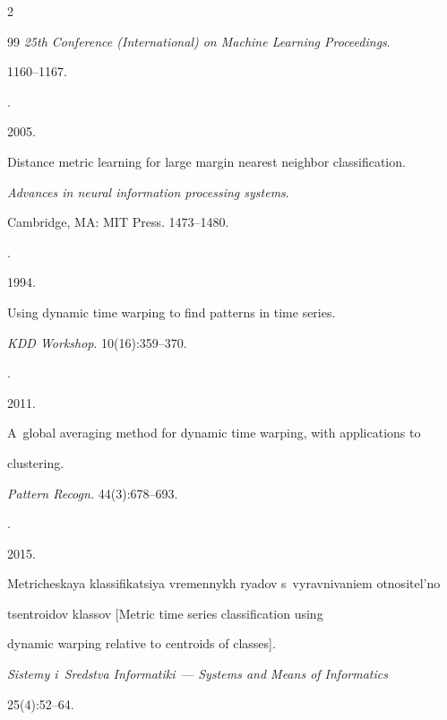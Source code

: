 \begin{multicols}{2}
{{\begin{thebibliography}{99}
\textit{25th  Conference (International) on Machine Learning Proceedings}.


1160--1167.







.


2005.


Distance metric learning for large margin nearest neighbor classification.


\textit{Advances in neural information processing systems}.


Cambridge, MA: MIT Press. 1473--1480.







.


1994.


Using dynamic time warping to find patterns in time series.


\textit{KDD Workshop}. 10(16):359--370.







.


2011.


A~global averaging method for dynamic time warping, with applications to


  clustering.


\textit{Pattern Recogn.} 44(3):678--693.







.


2015.


Metricheskaya klassifikatsiya vremennykh ryadov s~vyravnivaniem otnositel'no


  tsentroidov klassov [Metric time series classification using


  dynamic warping relative to centroids of classes].


\textit{Sistemy i~Sredstva Informatiki}~--- \textit{Systems and Means of Informatics}


25(4):52--64.






\end{thebibliography}}}
\end{multicols}

